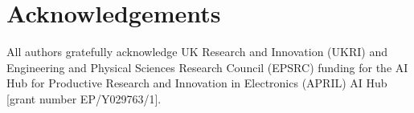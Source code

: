 \documentclass[conference]{IEEEtran}
\begin{document}

\section*{Acknowledgements}

All authors gratefully acknowledge UK Research and Innovation (UKRI) and Engineering and Physical Sciences Research Council (EPSRC) funding for the AI Hub for Productive Research and Innovation in Electronics (APRIL) AI Hub [grant number EP/Y029763/1].





\balance




\appendix

\end{document}
